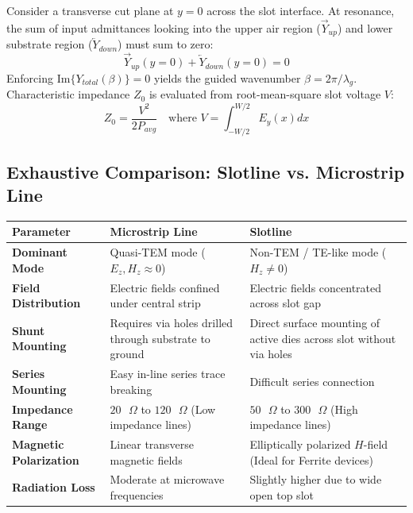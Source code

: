 \documentclass[10pt,a4paper]{article}
\begin{document}
\begin{tcolorbox}[formulabox, title={Transverse Resonance Condition}]
  Consider a transverse cut plane at $y = 0$ across the slot interface. At resonance, the sum of input admittances looking into the upper air region ($\vec{Y}_{up}$) and lower substrate region ($\overleftarrow{Y}_{down}$) must sum to zero:
  \begin{equation}
    \vec{Y}_{up}(y=0) + \overleftarrow{Y}_{down}(y=0) = 0
  \end{equation}
  Enforcing $\text{Im}\{Y_{total}(\beta)\} = 0$ yields the guided wavenumber $\beta = 2\pi/\lambda_g$. Characteristic impedance $Z_0$ is evaluated from root-mean-square slot voltage $V$:
  \begin{equation}
    Z_0 = \frac{V^2}{2 P_{avg}} \quad \text{where } V = \int_{-W/2}^{W/2} E_y(x) dx
  \end{equation}
\end{tcolorbox}

\subsection{Exhaustive Comparison: Slotline vs. Microstrip Line}

\par\vspace{6pt}\noindent
\begingroup
\renewcommand{\arraystretch}{1.4}%
\begin{tabularx}{\linewidth}{|>{\raggedright\arraybackslash\bfseries}p{3.2cm}|Y|Y|}
\hline
\textbf{Parameter} & \textbf{Microstrip Line} & \textbf{Slotline} \\
\hline
Dominant Mode & Quasi-TEM mode ($E_z, H_z \approx 0$) & Non-TEM / TE-like mode ($H_z \ne 0$) \\
\hline
Field Distribution & Electric fields confined under central strip & Electric fields concentrated across slot gap \\
\hline
Shunt Mounting & Requires via holes drilled through substrate to ground & Direct surface mounting of active dies across slot without via holes \\
\hline
Series Mounting & Easy in-line series trace breaking & Difficult series connection \\
\hline
Impedance Range & $20\text{ }\Omega$ to $120\text{ }\Omega$ (Low impedance lines) & $50\text{ }\Omega$ to $300\text{ }\Omega$ (High impedance lines) \\
\hline
Magnetic Polarization & Linear transverse magnetic fields & Elliptically polarized $H$-field (Ideal for Ferrite devices) \\
\hline
Radiation Loss & Moderate at microwave frequencies & Slightly higher due to wide open top slot \\
\hline
\end{tabularx}
\endgroup
\end{document}

